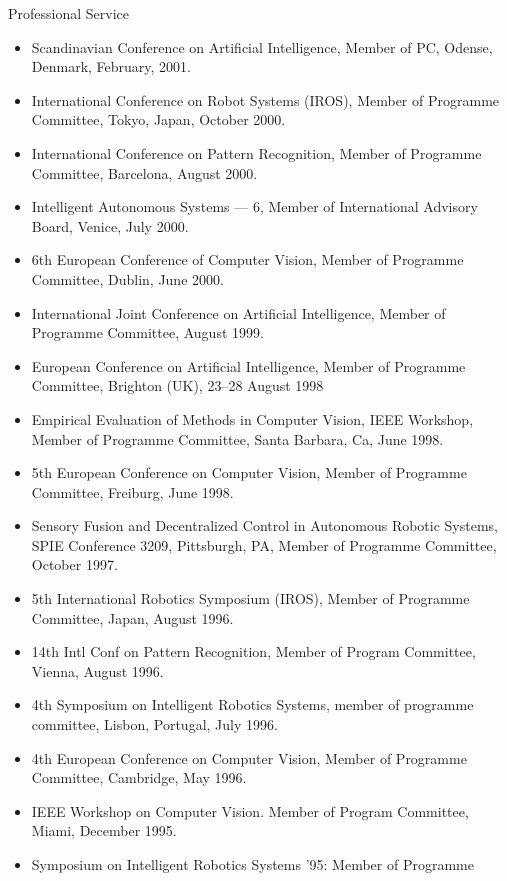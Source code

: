 \documentclass{article}
\begin{document}
\begin{cv}
\begin{cvlist}{Professional Service}
\begin{itemize}
			      Environments, Member of Programme Committee, Seoul, Korea, May 2001.
			\item Scandinavian Conference on Artificial Intelligence, Member of PC, Odense,
			      Denmark, February, 2001.
			\item International Conference on Robot Systems (IROS), Member of Programme
			      Committee, Tokyo, Japan, October 2000.
			\item International Conference on Pattern Recognition, Member of Programme
			      Committee, Barcelona, August 2000.
			\item Intelligent Autonomous Systems --- 6, Member of International Advisory
			      Board, Venice, July 2000.
			\item 6th European Conference of Computer Vision, Member of Programme Committee,
			      Dublin, June 2000.
			\item International Joint Conference on Artificial Intelligence, Member of
			      Programme Committee, August 1999.
			\item European Conference on Artificial Intelligence, Member of Programme
			      Committee, Brigh\-ton (UK), 23--28 August 1998
			\item Empirical Evaluation of Methods in Computer Vision, IEEE Workshop, Member
			      of Programme Committee, Santa Barbara, Ca, June 1998.
			\item 5th European Conference on Computer Vision, Member of Programme Committee,
			      Freiburg, June 1998.
			\item Sensory Fusion and Decentralized Control in Autonomous Robotic Systems,
			      SPIE Conference 3209, Pittsburgh, PA, Member of Programme Committee,
			      October 1997.
			\item 5th International Robotics Symposium (IROS), Member of Programme
			      Committee, Japan, August 1996.
			\item 14th Intl Conf on Pattern Recognition, Member of Program Committee,
			      Vienna, August 1996.
			\item 4th Symposium on Intelligent Robotics Systems, member of programme
			      committee, Lisbon, Portugal, July 1996.
			\item 4th European Conference on Computer Vision, Member of Programme Committee,
			      Cambridge, May 1996.
			\item IEEE Workshop on Computer Vision. Member of Program Committee, Miami,
			      December 1995.
			\item Symposium on Intelligent Robotics Systems '95: Member of Programme

\end{itemize}
\end{cvlist}
\end{cv}
\end{document}
